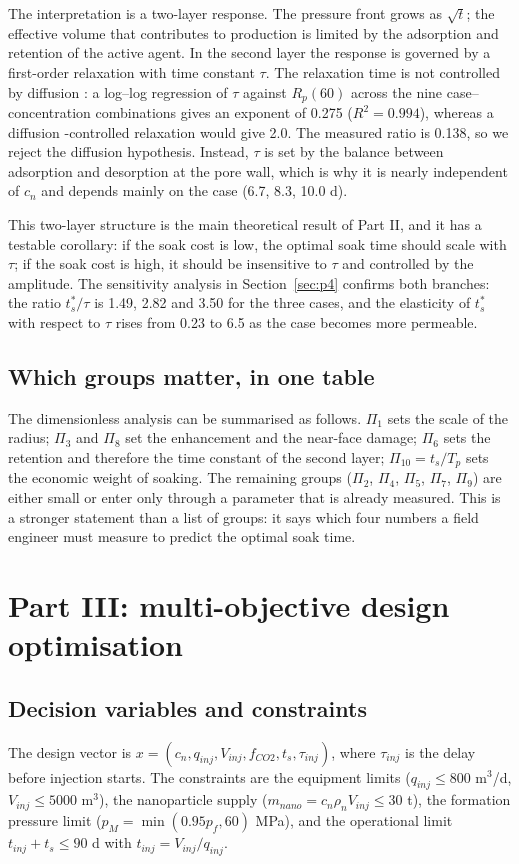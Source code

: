 \documentclass{swmcmthesis}
\begin{document}
The interpretation is a two-layer response. The pressure front grows as $\sqrt{t}$; the effective volume that contributes to production is limited by the adsorption and retention of the active agent. In the second layer the response is governed by a first-order relaxation with time constant $\tau$. The relaxation time is not controlled by diffusion \cite{crank}: a log--log regression of $\tau$ against $R_p(60)$ across the nine case--concentration combinations gives an exponent of 0.275 ($R^2=0.994$), whereas a diffusion \cite{crank}-controlled relaxation would give 2.0. The measured ratio is 0.138, so we reject the diffusion \cite{crank} hypothesis. Instead, $\tau$ is set by the balance between adsorption and desorption at the pore wall, which is why it is nearly independent of $c_n$ and depends mainly on the case (6.7, 8.3, 10.0 d).

This two-layer structure is the main theoretical result of Part II, and it has a testable corollary: if the soak cost is low, the optimal soak time should scale with $\tau$; if the soak cost is high, it should be insensitive to $\tau$ and controlled by the amplitude. The sensitivity analysis in Section~\ref{sec:p4} confirms both branches: the ratio $t_s^\ast/\tau$ is 1.49, 2.82 and 3.50 for the three cases, and the elasticity of $t_s^\ast$ with respect to $\tau$ rises from 0.23 to 6.5 as the case becomes more permeable.

\subsection{Which groups matter, in one table}
The dimensionless analysis can be summarised as follows. $\Pi_1$ sets the scale of the radius; $\Pi_3$ and $\Pi_8$ set the enhancement and the near-face damage; $\Pi_6$ sets the retention and therefore the time constant of the second layer; $\Pi_{10}=t_s/T_{p}$ sets the economic weight of soaking. The remaining groups ($\Pi_2$, $\Pi_4$, $\Pi_5$, $\Pi_7$, $\Pi_9$) are either small or enter only through a parameter that is already measured. This is a stronger statement than a list of groups: it says which four numbers a field engineer must measure to predict the optimal soak time.

\section{Part III: multi-objective design optimisation}\label{sec:p3}
\subsection{Decision variables and constraints}
The design vector is $x=(c_n,q_{inj},V_{inj},f_{CO2},t_s,\tau_{inj})$, where $\tau_{inj}$ is the delay before injection starts. The constraints are the equipment limits ($q_{inj}\le800$ m$^3$/d, $V_{inj}\le5000$ m$^3$), the nanoparticle supply ($m_{nano}=c_n\rho_{n}V_{inj}\le30$ t), the formation pressure limit ($p_{M}=\min(0.95p_f,60)$ MPa), and the operational limit $t_{inj}+t_s\le90$ d with $t_{inj}=V_{inj}/q_{inj}$.
\end{document}
